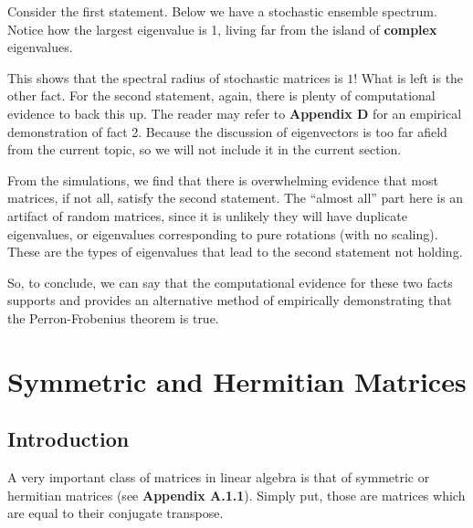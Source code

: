 Consider the first statement. Below we have a stochastic ensemble spectrum.
Notice how the largest eigenvalue is 1, living far from the island of \textbf{complex} eigenvalues.


This shows that the spectral radius of stochastic matrices is $1$! What is left is the other fact.
For the second statement, again, there is plenty of computational evidence to back this up.
The reader may refer to \textbf{Appendix D} for an empirical demonstration of fact 2.
Because the discussion of eigenvectors is too far afield from the current topic, so we will not include it in the current section.

From the simulations, we find that there is overwhelming evidence that most matrices, if not all, satisfy the second statement.
The ``almost all'' part here is an artifact of random matrices, since it is unlikely they will have duplicate eigenvalues, or eigenvalues corresponding to pure rotations (with no scaling).
These are the types of eigenvalues that lead to the second statement not holding. \newline

 So, to conclude, we can say that the computational evidence for these two facts supports and provides an alternative method of empirically demonstrating that the Perron-Frobenius theorem is true.


\newpage
\section{Symmetric and Hermitian Matrices}

\subsection{Introduction}
A very important class of matrices in linear algebra is that of symmetric or hermitian matrices (see \textbf{Appendix A.1.1}). Simply put, those are matrices which are equal to their conjugate transpose.

